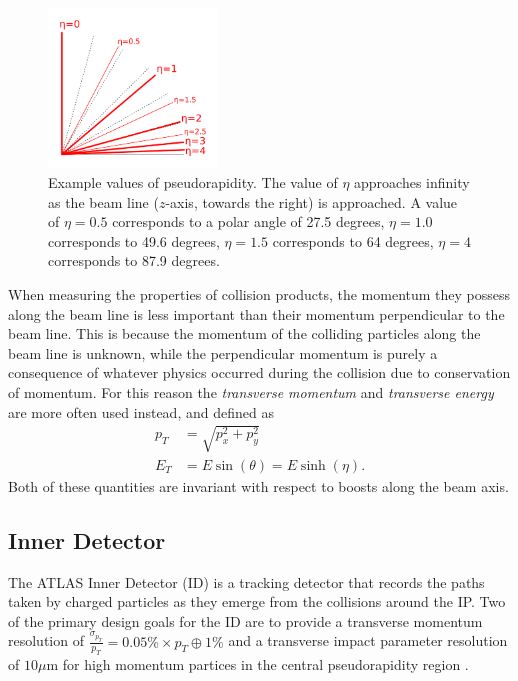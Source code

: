 \begin{figure}
	\centering
	\includegraphics[width=0.4\textwidth]{pseudorapidity}
	\caption{Example values of pseudorapidity. The value of $\eta$ approaches infinity as the beam line ($z$-axis, towards the right) is approached. A value of $\eta = 0.5$ corresponds to a polar angle of 27.5 degrees, $\eta = 1.0$ corresponds to 49.6 degrees, $\eta = 1.5$ corresponds to 64 degrees, $\eta = 4$ corresponds to 87.9 degrees. }
	\label{fig:pseudorapidity}
\end{figure}

When measuring the properties of collision products, the momentum they possess along the beam line is less important than their momentum perpendicular to the beam line. This is because the momentum of the colliding particles along the beam line is unknown, while the perpendicular momentum is purely a consequence of whatever physics occurred during the collision due to conservation of momentum.
For this reason the \textit{transverse momentum} and \textit{transverse energy} are more often used instead, and defined as
\begin{align}
p_T &= \sqrt{p_x^2 + p_y^2} \\
E_T &= E \sin(\theta) = E \sinh(\eta).
\label{eqn:transverse_momentum_energy}
\end{align}
Both of these quantities are invariant with respect to boosts along the beam axis.

\subsection{Inner Detector}
\label{sec:inner_detector}
The ATLAS Inner Detector (ID) \cite{CERN-LHCC-97-016} \cite{ATLAS-TDR-2008} is a tracking detector that records the paths taken by charged particles as they emerge from the collisions around the IP.
Two of the primary design goals for the ID are to provide a transverse momentum resolution of $\frac{\sigma_{p_T}}{p_T} = 0.05\% \times p_T \oplus 1\%$ and a transverse impact parameter resolution of $10 \mu$m for high momentum partices in the central pseudorapidity region \cite{ATLAS-TDR-2008}.

